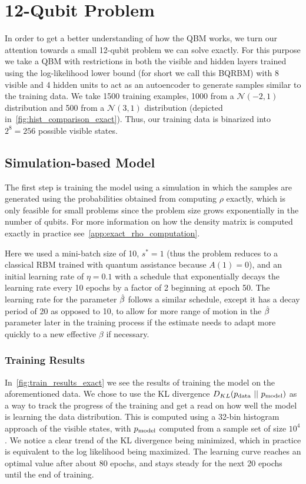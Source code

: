 \section{12-Qubit Problem}
In order to get a better understanding of how the QBM works, we turn our attention towards a small 12-qubit problem we can solve exactly.
For this purpose we take a QBM with restrictions in both the visible and hidden layers trained using the log-likelihood lower bound (for short we call this BQRBM) with 8 visible and 4 hidden units to act as an autoencoder to generate samples similar to the training data.
We take 1500 training examples, 1000 from a \( \mathcal{N}(-2, 1) \) distribution and 500 from a \( \mathcal{N}(3, 1) \) distribution (depicted in~\cref{fig:hist_comparison_exact}).
Thus, our training data is binarized into \( 2^8 = 256 \) possible visible states.

\subsection{Simulation-based Model}
The first step is training the model using a simulation in which the samples are generated using the probabilities obtained from computing \( \rho \) exactly, which is only feasible for small problems since the problem size grows exponentially in the number of qubits.
For more information on how the density matrix is computed exactly in practice see~\cref{app:exact_rho_computation}.

Here we used a mini-batch size of 10, \( s^* = 1 \) (thus the problem reduces to a classical RBM trained with quantum assistance because \( A(1) = 0 \)), and an initial learning rate of \( \eta = 0.1 \) with a schedule that exponentially decays the learning rate every 10 epochs by a factor of 2 beginning at epoch 50.
The learning rate for the parameter \( \hat{\beta} \) follows a similar schedule, except it has a decay period of 20 as opposed to 10, to allow for more range of motion in the \( \hat{\beta} \) parameter later in the training process if the estimate needs to adapt more quickly to a new effective \( \beta \) if necessary.

\subsubsection{Training Results}
In~\cref{fig:train_results_exact} we see the results of training the model on the aforementioned data.
We chose to use the KL divergence \( D_{KL}(p_{\text{data}} \ || \ p_{\text{model}}) \) as a way to track the progress of the training and get a read on how well the model is learning the data distribution.
This is computed using a 32-bin histogram approach of the visible states, with \( p_{\text{model}} \) computed from a sample set of size \( 10^4 \).
We notice a clear trend of the KL divergence being minimized, which in practice is equivalent to the log likelihood being maximized.
The learning curve reaches an optimal value after about 80 epochs, and stays steady for the next 20 epochs until the end of training.

